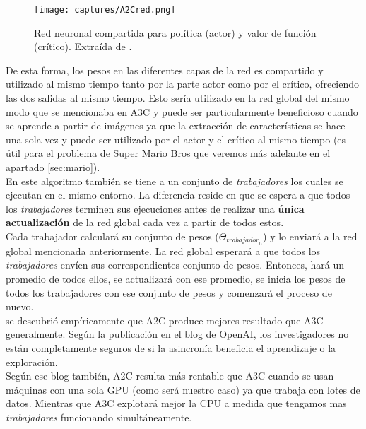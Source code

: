 \documentclass[11pt,fleqn]{book} %
\begin{document}
\begin{figure}[H]
	\centering\texttt{[image: captures/A2Cred.png]}
	\caption{Red neuronal compartida para política (actor) y valor de función (crítico). Extraída de \cite{book:miguel}.}
	\label{fig:A2Cred} %
\end{figure}

De esta forma, los pesos en las diferentes capas de la red es compartido y utilizado al mismo tiempo tanto por la parte actor como por el crítico, ofreciendo las dos salidas al mismo tiempo. Esto sería utilizado en la red global del mismo modo que se mencionaba en A3C y puede ser particularmente beneficioso cuando se aprende a partir de imágenes ya que la extracción de características se hace una sola vez y puede ser utilizado por el actor y el crítico al mismo tiempo (es útil para el problema de Super Mario Bros que veremos más adelante en el apartado \ref{sec:mario}). \\

En este algoritmo también se tiene a un conjunto de \textit{trabajadores} los cuales se ejecutan en el mismo entorno. La diferencia reside en que se espera a que todos los \textit{trabajadores} terminen sus ejecuciones antes de realizar una \textbf{única actualización} de la red global cada vez a partir de todos estos. \\

Cada trabajador calculará su conjunto de pesos ($\Theta_{trabajador_n}$) y lo enviará a la red global mencionada anteriormente. La red global esperará a que todos los \textit{trabajadores} envíen sus correspondientes conjunto de pesos. Entonces, hará un promedio de todos ellos, se actualizará con ese promedio, se inicia los pesos de todos los trabajadores con ese conjunto de pesos y comenzará el proceso de nuevo. \\

se descubrió empíricamente que A2C produce mejores resultado que A3C generalmente. Según la publicación en el blog de OpenAI, los investigadores no están completamente seguros de si la asincronía beneficia el aprendizaje o la exploración. \\

Según ese blog también, A2C resulta más rentable que A3C cuando se usan máquinas con una sola GPU (como será nuestro caso) ya que trabaja con lotes de datos. Mientras que A3C explotará mejor la CPU a medida que tengamos mas \textit{trabajadores} funcionando simultáneamente. \\
\end{document}
